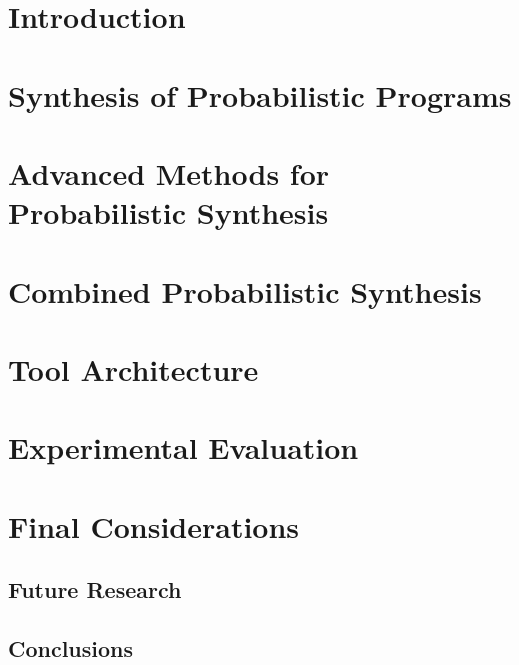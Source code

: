\chapter{Introduction}

\chapter{Synthesis of Probabilistic Programs}

\chapter{Advanced Methods for Probabilistic Synthesis}

\chapter{Combined Probabilistic Synthesis}

\chapter{Tool Architecture}

\chapter{Experimental Evaluation}

\chapter{Final Considerations}

\section{Future Research}

\section{Conclusions}
